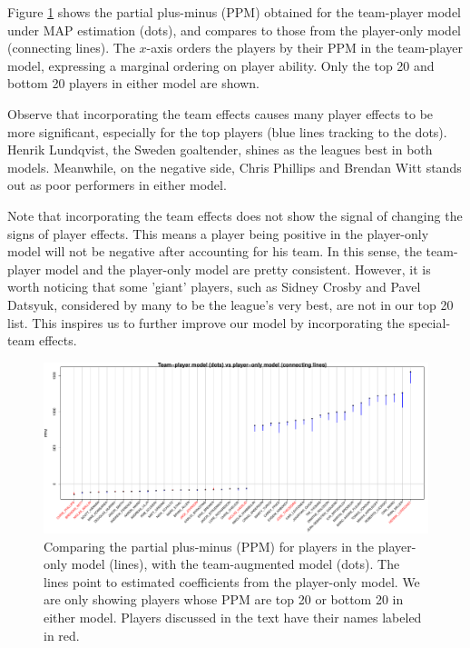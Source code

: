 Figure \ref{fig:pt-p.tb20} shows the partial plus-minus (PPM) obtained for the team-player model under MAP estimation (dots), and compares to those from the player-only model (connecting lines). The $x$-axis orders the players by their PPM in the team-player model, expressing a marginal ordering on player ability. Only the top 20 and bottom 20 players in either model are shown. 

Observe that incorporating the team effects causes many player effects to be more significant, especially for the top players (blue lines tracking to the dots). Henrik Lundqvist, the Sweden goaltender, shines as the leagues best in both models. Meanwhile, on the negative side, Chris Phillips and Brendan Witt stands out as poor performers in either model. 

Note that incorporating the team effects does not show the signal of changing the signs of player effects. This means a player being positive in the player-only model will not be negative after accounting for his team. In this sense, the team-player model and the player-only model are pretty consistent. However, it is worth noticing that some 'giant' players, such as Sidney Crosby and Pavel Datsyuk, considered by many to be the league's very best, are not in our top 20 list. This inspires us to further improve our model by incorporating the special-team effects. 

\begin{figure}[htb!]
	\centering
	\includegraphics[width=\textwidth]{figures/ptvsp_tb20.pdf}
	\caption{Comparing the partial plus-minus (PPM) for players in the player-only model (lines), with the team-augmented model (dots). The lines point to estimated coefficients from the player-only model. We are only showing players whose PPM are top 20 or bottom 20 in either model. Players discussed in the text have their names labeled in red.}\label{fig:pt-p.tb20}
\end{figure}

